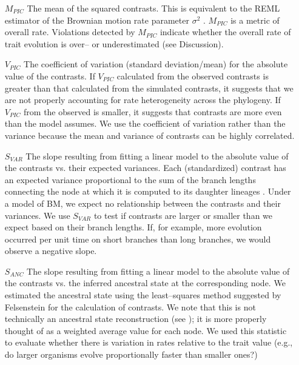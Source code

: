 \documentclass[a4paper,12pt]{article}
\begin{document}
\begin{enumerate}
\item[$M_{PIC}$] The mean of the squared contrasts. This is equivalent to the REML estimator of the Brownian motion rate parameter $\sigma^2$ \citep{Garland1992, Rohlf2001}. $M_{PIC}$ is a metric of overall rate. Violations detected by $M_{PIC}$ indicate whether the overall rate of trait evolution is over-- or underestimated (see Discussion).

\item[$V_{PIC}$] The coefficient of variation (standard deviation/mean) for the absolute value of the contrasts. If $V_{PIC}$ calculated from the observed contrasts is greater than that calculated from the simulated contrasts, it suggests that we are not properly accounting for rate heterogeneity across the phylogeny. If $V_{PIC}$ from the observed is smaller, it suggests that contrasts are more even than the model assumes. We use the coefficient of variation rather than the variance because the mean and variance of contrasts can be highly correlated.

\item[$S_{VAR}$] The slope resulting from fitting a linear model to the absolute value of the contrasts vs. their expected variances. Each (standardized) contrast has an expected variance proportional to the sum of the branch lengths connecting the node at which it is computed to its daughter lineages  \citep{Felsenstein1985}. Under a model of BM, we expect no relationship between the contrasts and their variances. We use $S_{VAR}$ to test if contrasts are larger or smaller than we expect based on their branch lengths. If, for example, more evolution occurred per unit time on short branches than long branches, we would observe a negative slope.

\item[$S_{ANC}$] The slope resulting from fitting a linear model to the absolute value of the contrasts vs. the inferred ancestral state at the corresponding node. We estimated the ancestral state using the least--squares method suggested by Felsenstein \citep{Felsenstein1985} for the calculation of contrasts. We note that this is not technically an ancestral state reconstruction (see \citep{Felsenstein1985}); it is more properly thought of as a weighted average value for each node. We used this statistic to evaluate whether there is variation in rates relative to the trait value (e.g., do larger organisms evolve proportionally faster than smaller ones?)


\end{enumerate}
\end{document}
